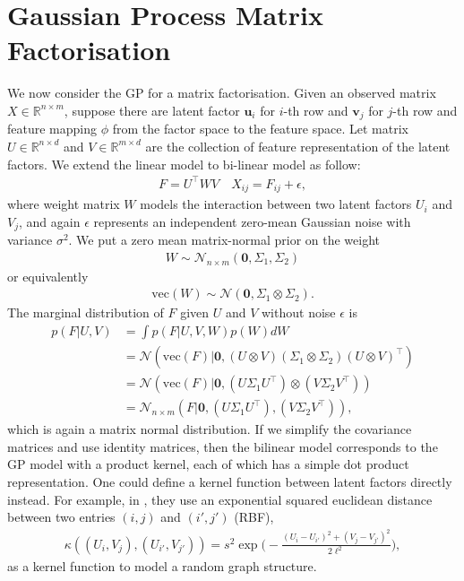\documentclass{article} %
\theoremstyle{definition}
\newcommand\mb{\mathbf}
\newcommand\mc{\mathcal}
\begin{document}
\section{Gaussian Process Matrix Factorisation}
We now consider the GP for a matrix factorisation. Given an observed matrix $X \in \mathbb{R}^{n\times m}$, suppose there are latent factor $\mb{u}_i$ for $i$-th row and $\mb{v}_j$ for $j$-th row and feature mapping $\phi$ from the factor space to the feature space. Let matrix $U \in \mathbb{R}^{n \times d}$ and $V \in \mathbb{R}^{m \times d}$ are the collection of feature representation of the latent factors. We extend the linear model to bi-linear model as follow:
\begin{align}
F = U^\top W V \quad X_{ij} = F_{ij} + \epsilon, 
\end{align}
where weight matrix $W$ models the interaction between two latent factors $U_i$ and $V_j$, and again $\epsilon$ represents an independent zero-mean Gaussian noise with variance $\sigma^2$. We put a zero mean matrix-normal prior on the weight
\begin{align}
W \sim \mc{N}_{n\times m}(\mb{0}, \Sigma_{1}, \Sigma_{2})
\end{align}
or equivalently
\begin{align}
\text{vec}(W) \sim \mc{N}(\mb{0}, \Sigma_{1} \otimes \Sigma_{2}).
\end{align}
The marginal distribution of $F$ given $U$ and $V$ without noise $\epsilon$ is
\begin{align}
p(F|U,V) & = \int p(F|U,V,W)p(W) dW \\
& =  \mc{N}(\text{vec}(F)|\mb{0}, (U\otimes V)(\Sigma_{1} \otimes \Sigma_{2})(U\otimes V)^\top)\\
& =  \mc{N}(\text{vec}(F)|\mb{0}, (U \Sigma_{1} U^\top) \otimes (V \Sigma_{2} V^\top) )\\
& =  \mc{N}_{n\times m}(F|\mb{0}, (U \Sigma_{1} U^\top), (V \Sigma_{2} V^\top) ) \label{eqn:matrix_gp},
\end{align}
which is again a matrix normal distribution.
If we simplify the covariance matrices and use identity matrices, then the bilinear model corresponds to the GP model with a product kernel, each of which has a simple dot product representation. One could define a kernel function between latent factors directly instead. For example, in \cite{Lloyd2013}, they use an exponential squared euclidean distance between two entries $(i,j)$ and $(i',j')$ (RBF),
\begin{align}
\kappa((U_i, V_j), (U_{i'}, V_{j'})) = s^2 \exp\bigg(-\frac{(U_i - U_{i'})^2 + (V_j - V_{j'})^2}{2\ell^2}\bigg),
\end{align}
as a kernel function to model a random graph structure.
\end{document}
